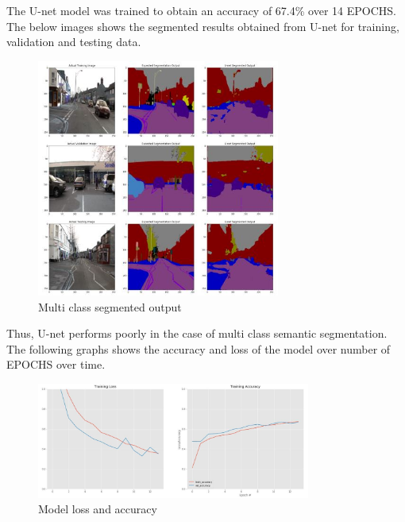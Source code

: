 \documentclass{IEEEtran}
\begin{document}
The U-net model was trained to obtain an accuracy of 67.4\% over 14 EPOCHS. The below images shows the segmented results obtained from U-net for training, validation and testing data.

\begin{figure}[h]
    \centering
    \captionsetup{justification=centering}
    \includegraphics[width=8cm]{multiclassoutput}
    \caption{Multi class segmented output}
    \label{fig:Multi class segmented output}
\end{figure}


Thus, U-net performs poorly in the case of multi class semantic segmentation. The following graphs shows the accuracy and loss of the model over number of EPOCHS over time.


\begin{figure}[h]
    \centering
    \captionsetup{justification=centering}
    \includegraphics[width=9cm]{acc}
    \caption{Model loss and accuracy}
    \label{fig:}
\end{figure}
\end{document}
